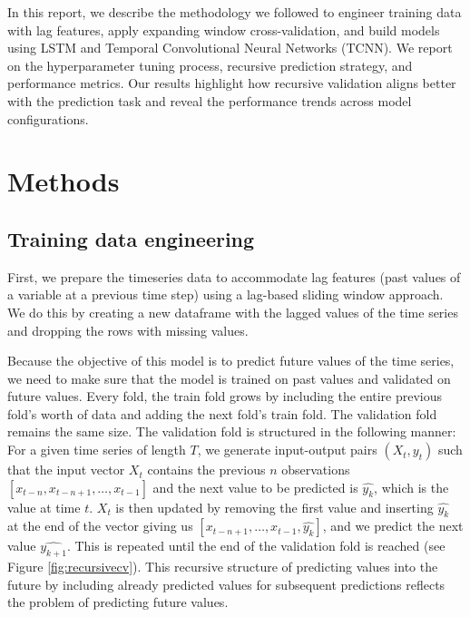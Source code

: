 \documentclass[conference]{IEEEtran}
\begin{document}
In this report, we describe the methodology we followed to engineer training data with lag 
features, apply expanding window cross-validation, and build models using LSTM and Temporal 
Convolutional Neural Networks (TCNN). We report on the hyperparameter tuning process, recursive 
prediction strategy, and performance metrics. Our results highlight how recursive validation aligns
better with the prediction task and reveal the performance trends across model configurations.

\section{Methods}
\subsection{Training data engineering}\label{traindataengineer}
First, we prepare the timeseries data to accommodate lag features (past values of a variable at a
previous time step) using a lag-based sliding window approach. We do this by creating a new 
dataframe with the lagged values of the time series and dropping the rows with missing values.

Because the objective of this model is to predict future values of the time series, we need to
make sure that the model is trained on past values and validated on future values. Every fold, the 
train fold grows by including the entire previous fold's worth of data and adding the next fold's train fold.  
The validation fold remains the same size. The validation fold is structured in the following manner:
For a given time series of length $T$, we generate input-output pairs $(X_t,y_t)$ such that the 
input vector $X_t$ contains the previous $n$ observations $[x_{t-n}, x_{t-n+1}, \ldots, x_{t-1}]$ 
and the next value to be predicted is $\hat{y_k}$, which is the value at time $t$. $X_t$ is then 
updated by removing the first value and inserting $\hat{y_k}$ at the end of the vector giving us
$[x_{t-n+1}, \ldots, x_{t-1}, \hat{y_k}]$, and we predict the next value $\hat{y_{k+1}}$. This is 
repeated until the end of the validation fold is reached (see Figure \ref{fig:recursivecv}). This recursive structure of predicting 
values into the future by including already predicted values for subsequent predictions reflects 
the problem of predicting future values. 
\end{document}
